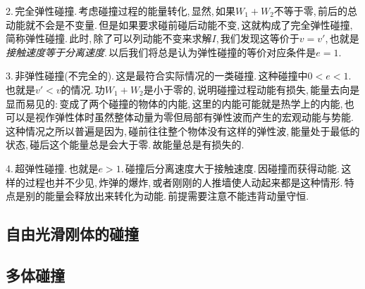 2.\,完全弹性碰撞.\,考虑碰撞过程的能量转化,\,显然,\,如果$W_1+W_2$不等于零,\,前后的总动能就不会是不变量.\,但是如果要求碰前碰后动能不变,\,这就构成了完全弹性碰撞,\,简称弹性碰撞.\,此时,\,除了可以列动能不变来求解$I$,\,我们发现这等价于$v=v'$,\,也就是\emph{接触速度等于分离速度}.\,以后我们将总是认为弹性碰撞的等价对应条件是$e=1$.

3.\,非弹性碰撞(不完全的).\,这是最符合实际情况的一类碰撞.\,这种碰撞中$0<e<1$.\,也就是$v'<v$的情况.\,功$W_1+W_2$是小于零的,\,说明碰撞过程动能有损失,\,能量去向是显而易见的:\,变成了两个碰撞的物体的内能,\,这里的内能可能就是热学上的内能,\,也可以是视作弹性体时虽然整体动量为零但局部有弹性波而产生的宏观动能与势能.\,这种情况之所以普遍是因为,\,碰前往往整个物体没有这样的弹性波,\,能量处于最低的状态,\,碰后这个能量总是会大于零.\,故能量总是有损失的.

4.\,超弹性碰撞.\,也就是$e>1$.\,碰撞后分离速度大于接触速度.\,因碰撞而获得动能.\,这样的过程也并不少见,\,炸弹的爆炸,\,或者刚刚的人推墙使人动起来都是这种情形.\,特点是别的能量会释放出来转化为动能.\,前提需要注意不能违背动量守恒.





\subsection{自由光滑刚体的碰撞}

\subsection{多体碰撞}
